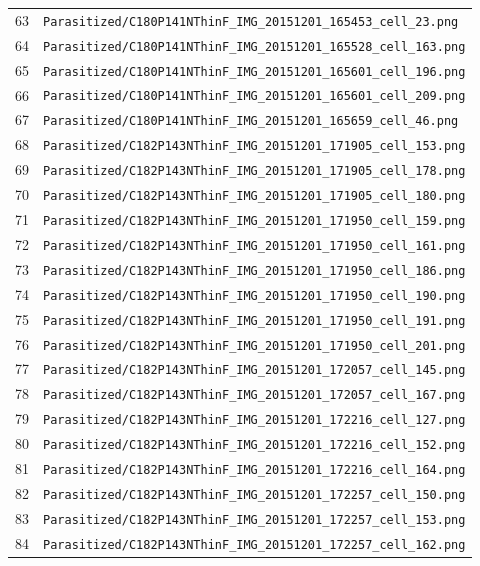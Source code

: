 \begin{longtable}{r p{12cm}}
63 & \texttt{Parasitized/C180P141NThinF\_IMG\_20151201\_165453\_cell\_23.png} \\
64 & \texttt{Parasitized/C180P141NThinF\_IMG\_20151201\_165528\_cell\_163.png} \\
65 & \texttt{Parasitized/C180P141NThinF\_IMG\_20151201\_165601\_cell\_196.png} \\
66 & \texttt{Parasitized/C180P141NThinF\_IMG\_20151201\_165601\_cell\_209.png} \\
67 & \texttt{Parasitized/C180P141NThinF\_IMG\_20151201\_165659\_cell\_46.png} \\
68 & \texttt{Parasitized/C182P143NThinF\_IMG\_20151201\_171905\_cell\_153.png} \\
69 & \texttt{Parasitized/C182P143NThinF\_IMG\_20151201\_171905\_cell\_178.png} \\
70 & \texttt{Parasitized/C182P143NThinF\_IMG\_20151201\_171905\_cell\_180.png} \\
71 & \texttt{Parasitized/C182P143NThinF\_IMG\_20151201\_171950\_cell\_159.png} \\
72 & \texttt{Parasitized/C182P143NThinF\_IMG\_20151201\_171950\_cell\_161.png} \\
73 & \texttt{Parasitized/C182P143NThinF\_IMG\_20151201\_171950\_cell\_186.png} \\
74 & \texttt{Parasitized/C182P143NThinF\_IMG\_20151201\_171950\_cell\_190.png} \\
75 & \texttt{Parasitized/C182P143NThinF\_IMG\_20151201\_171950\_cell\_191.png} \\
76 & \texttt{Parasitized/C182P143NThinF\_IMG\_20151201\_171950\_cell\_201.png} \\
77 & \texttt{Parasitized/C182P143NThinF\_IMG\_20151201\_172057\_cell\_145.png} \\
78 & \texttt{Parasitized/C182P143NThinF\_IMG\_20151201\_172057\_cell\_167.png} \\
79 & \texttt{Parasitized/C182P143NThinF\_IMG\_20151201\_172216\_cell\_127.png} \\
80 & \texttt{Parasitized/C182P143NThinF\_IMG\_20151201\_172216\_cell\_152.png} \\
81 & \texttt{Parasitized/C182P143NThinF\_IMG\_20151201\_172216\_cell\_164.png} \\
82 & \texttt{Parasitized/C182P143NThinF\_IMG\_20151201\_172257\_cell\_150.png} \\
83 & \texttt{Parasitized/C182P143NThinF\_IMG\_20151201\_172257\_cell\_153.png} \\
84 & \texttt{Parasitized/C182P143NThinF\_IMG\_20151201\_172257\_cell\_162.png} \\

\end{longtable}
